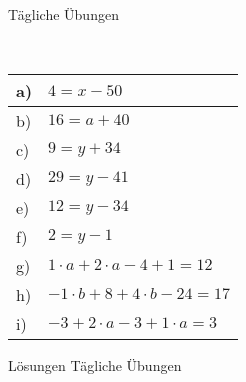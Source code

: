 \documentclass[12pt]{article}
\begin{document}
\centerline{{\Large Tägliche Übungen}} 
\vspace{1cm}
\noindent \\


\begin{xltabular}{\textwidth}{|C{0.75cm}|X|}
\hline
a)&$4=x-50$
\\\hline
b)&$16=a+40$
\\\hline
c)&$9=y+34$
\\\hline
d)&$29=y-41$
\\\hline
e)&$12=y-34$
\\\hline
f)&$2=y-1$
\\\hline
g)&$1\cdot a+2\cdot a-4+1=12$
\\\hline
h)&$-1\cdot b+8+4\cdot b-24=17$
\\\hline
i)&$-3+2\cdot a-3+1\cdot a=3$
\\\hline
\end{xltabular}
\vspace{0.5cm}
\newpage
{}
\centerline{{\large Lösungen Tägliche Übungen}} 
\vspace{0.5cm}
\end{document}
